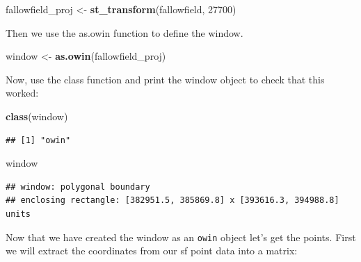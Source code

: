 \documentclass[]{book}
\newenvironment{Shaded}{\begin{snugshade}}{\end{snugshade}}
\newcommand{\CommentTok}[1]{\textcolor[rgb]{0.56,0.35,0.01}{\textit{#1}}}
\newcommand{\DataTypeTok}[1]{\textcolor[rgb]{0.13,0.29,0.53}{#1}}
\newcommand{\DecValTok}[1]{\textcolor[rgb]{0.00,0.00,0.81}{#1}}
\newcommand{\KeywordTok}[1]{\textcolor[rgb]{0.13,0.29,0.53}{\textbf{#1}}}
\newcommand{\NormalTok}[1]{#1}
\newcommand{\OperatorTok}[1]{\textcolor[rgb]{0.81,0.36,0.00}{\textbf{#1}}}
\newcommand{\StringTok}[1]{\textcolor[rgb]{0.31,0.60,0.02}{#1}}
\begin{document}
\begin{Shaded}
\begin{Highlighting}[]
\NormalTok{fallowfield_proj <-}\StringTok{ }\KeywordTok{st_transform}\NormalTok{(fallowfield, }\DecValTok{27700}\NormalTok{)}
\end{Highlighting}
\end{Shaded}

Then we use the as.owin function to define the window.

\begin{Shaded}
\begin{Highlighting}[]
\NormalTok{window <-}\StringTok{ }\KeywordTok{as.owin}\NormalTok{(fallowfield_proj)}
\end{Highlighting}
\end{Shaded}

Now, use the class function and print the window object to check that this worked:

\begin{Shaded}
\begin{Highlighting}[]
\KeywordTok{class}\NormalTok{(window)}
\end{Highlighting}
\end{Shaded}

\begin{verbatim}
## [1] "owin"
\end{verbatim}

\begin{Shaded}
\begin{Highlighting}[]
\NormalTok{window}
\end{Highlighting}
\end{Shaded}

\begin{verbatim}
## window: polygonal boundary
## enclosing rectangle: [382951.5, 385869.8] x [393616.3, 394988.8] units
\end{verbatim}

Now that we have created the window as an \texttt{owin} object let's get the points. First we will extract the coordinates from our sf point data into a matrix:

\begin{Shaded}
\end{Shaded}
\end{document}
